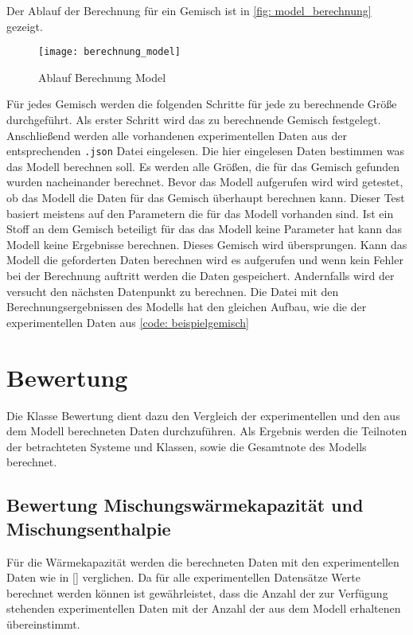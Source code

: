 \documentclass[../thesis.tex]{subfiles}
\begin{document}
Der Ablauf der Berechnung für ein Gemisch ist in \autoref{fig: model_berechnung} gezeigt.

\begin{figure}[htb]
	\centering
	\texttt{[image: berechnung\_model]}
	\caption{Ablauf Berechnung Model}
	\label{fig: model_berechnung}
\end{figure}

Für jedes Gemisch werden die folgenden Schritte für jede zu berechnende Größe durchgeführt. Als erster Schritt wird das zu berechnende Gemisch festgelegt. Anschließend werden alle vorhandenen experimentellen Daten aus der entsprechenden \texttt{.json} Datei eingelesen. Die hier eingelesen Daten bestimmen was das Modell berechnen soll. Es werden alle Größen, die für das Gemisch gefunden wurden nacheinander berechnet. Bevor das Modell aufgerufen wird wird getestet, ob das Modell die Daten für das Gemisch überhaupt berechnen kann. Dieser Test basiert meistens auf den Parametern die für das Modell vorhanden sind. Ist ein Stoff an dem Gemisch beteiligt für das das Modell keine Parameter hat kann das Modell keine Ergebnisse berechnen. Dieses Gemisch wird übersprungen.
Kann das Modell die geforderten Daten berechnen wird es aufgerufen und wenn kein Fehler bei der Berechnung auftritt werden die Daten gespeichert. Andernfalls wird der versucht den nächsten Datenpunkt zu berechnen. Die Datei mit den Berechnungsergebnissen des Modells hat den gleichen Aufbau, wie die der experimentellen Daten aus \autoref{code: beispielgemisch}

\section{Bewertung}

Die Klasse Bewertung dient dazu den Vergleich der experimentellen und den aus dem Modell berechneten Daten durchzuführen. Als Ergebnis werden die Teilnoten der betrachteten Systeme und Klassen, sowie die Gesamtnote des Modells berechnet.

\subsection{Bewertung Mischungswärmekapazität und Mischungsenthalpie}

Für die Wärmekapazität werden die berechneten Daten mit den experimentellen Daten wie in \autoref{} verglichen. Da für alle experimentellen Datensätze Werte berechnet werden können ist gewährleistet, dass die Anzahl der zur Verfügung stehenden experimentellen Daten mit der Anzahl der aus dem Modell erhaltenen übereinstimmt.
\end{document}
